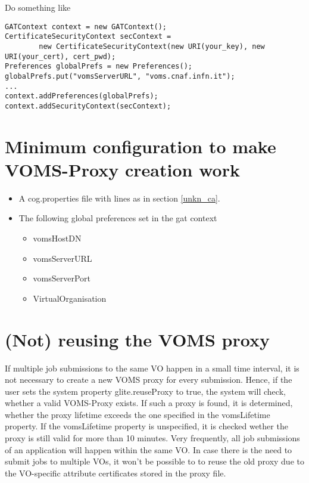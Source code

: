 \documentclass{scrreprt}
\begin{document}
Do something like

\begin{verbatim}
GATContext context = new GATContext();
CertificateSecurityContext secContext = 
		new CertificateSecurityContext(new URI(your_key), new URI(your_cert), cert_pwd);
Preferences globalPrefs = new Preferences();
globalPrefs.put("vomsServerURL", "voms.cnaf.infn.it");
...
context.addPreferences(globalPrefs);
context.addSecurityContext(secContext);
\end{verbatim}

\section{Minimum configuration to make VOMS-Proxy creation work}\label{min_voms_config}

\begin{itemize}
 \item A cog.properties file with lines as in section \ref{unkn_ca}.
 \item The following global preferences set in the gat context
 \begin{itemize}
  \item vomsHostDN
  \item vomsServerURL
  \item vomsServerPort
  \item VirtualOrganisation 
 \end{itemize}
\end{itemize}

\section{(Not) reusing the VOMS proxy}

If multiple job submissions to the same VO happen in a small time interval, it is not necessary to create
a new VOMS proxy for every submission. 
Hence, if the user sets the system property glite.reuseProxy to true, the system will check, whether a valid VOMS-Proxy
exists. If such a proxy is found, it is determined, whether the proxy lifetime exceeds the one specified in
the vomsLifetime property. If the vomsLifetime property is unspecified, it is checked wether the proxy is still
valid for more than 10 minutes.
Very frequently, all job submissions of an application will happen within the same VO. In case there is the
need to submit jobs to multiple VOs, it won't be possible to to reuse the old proxy due to the VO-specific
attribute certificates stored in the proxy file. 
\end{document}
